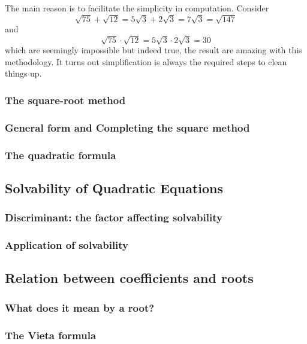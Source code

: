 \documentclass[12pt]{article}
\begin{document}
    The main reason is to facilitate the simplicity in computation. Consider \[\sqrt{75}+\sqrt{12}=5\sqrt{3}+2\sqrt{3}=7\sqrt{3}=\sqrt{147}\] and \[\sqrt{75}\cdot \sqrt{12}=5\sqrt{3}\cdot 2\sqrt{3}=30\] which are seemingly impossible but indeed true, the result are amazing with this methodology. It turns out simplification is always the required steps to clean things up.
    \subsubsection*{The square-root method}

    \subsubsection*{General form and Completing the square method}

    \subsubsection*{The quadratic formula}

    \subsection{Solvability of Quadratic Equations}

    \subsubsection*{Discriminant: the factor affecting solvability}

    \subsubsection*{Application of solvability}

    \subsection{Relation between coefficients and roots}

    \subsubsection*{What does it mean by a root?}

    \subsubsection*{The Vieta formula}
\end{document}
